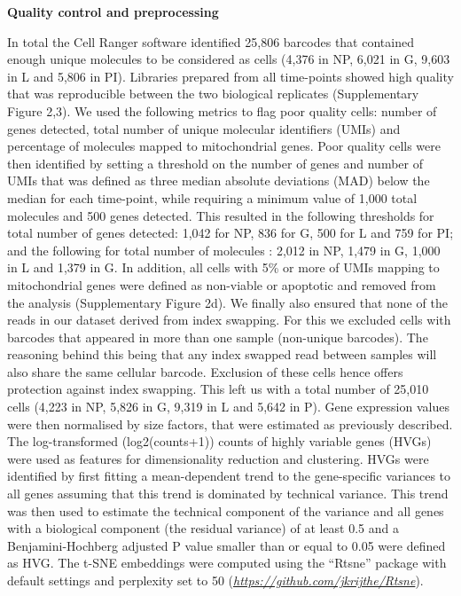 \documentclass[titlepage, 12pt, oneside]{amsart}
\begin{document}
\textbf{Quality control and preprocessing}

In total the Cell Ranger software identified 25,806 barcodes that contained enough unique molecules to be considered as cells (4,376 in NP, 6,021 in G, 9,603 in L and 5,806 in PI).
Libraries prepared from all time-points showed high quality that was reproducible between the two biological replicates (Supplementary Figure 2,3).
We used the following metrics to flag poor quality cells: number of genes detected, total number of unique molecular identifiers (UMIs) and percentage of molecules mapped to mitochondrial genes.
Poor quality cells were then identified by setting a threshold on the number of genes and number of UMIs that was defined as three median absolute deviations (MAD) below the median for each time-point, while requiring a minimum value of 1,000 total molecules and 500 genes detected.  
This resulted in the following thresholds for total number of genes detected: 1,042 for NP, 836 for G, 500 for L and 759 for PI; and the following for total number of molecules : 2,012 in NP, 1,479 in G, 1,000 in L and 1,379 in G.
In addition, all cells with 5\% or more of UMIs mapping to mitochondrial genes were defined as non-viable or apoptotic and removed from the analysis (Supplementary Figure 2d).
We finally also ensured that none of the reads in our dataset derived from index swapping\autocite{Sinha2017, Griffiths2017}.
For this we excluded cells with barcodes that appeared in more than one sample (non-unique barcodes).
The reasoning behind this being that any index swapped read between samples will also share the same cellular barcode.
Exclusion of these cells hence offers protection against index swapping.
This left us with a total number of 25,010 cells (4,223 in NP, 5,826 in G, 9,319 in L and 5,642 in P).
Gene expression values were then normalised by size factors, that were estimated as previously described\autocite{Lun2016}.
The log-transformed (log2(counts+1)) counts of highly variable genes (HVGs) were used as features for dimensionality reduction and clustering.
HVGs were identified by first fitting a mean-dependent trend to the gene-specific variances to all genes assuming that this trend is dominated by technical variance.
This trend was then used to estimate the technical component of the variance and all genes with a biological component (the residual variance) of at least 0.5 and a Benjamini-Hochberg adjusted P value smaller than or equal to 0.05 were defined as HVG.
The t-SNE embeddings were computed using the ``Rtsne'' package with default settings and perplexity set to 50 (\href{https://github.com/jkrijthe/Rtsne}{\textit{https://github.com/jkrijthe/Rtsne}}).
\end{document}
